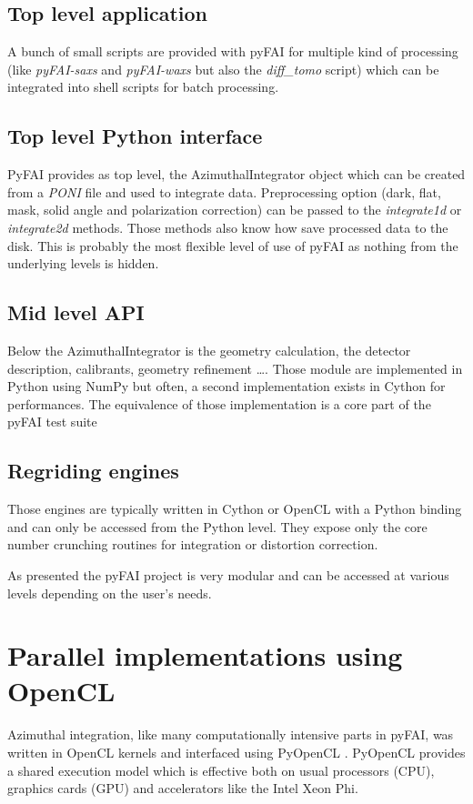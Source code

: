 \documentclass{iucr}
\begin{document}
\subsection{Top level application}
A bunch of small scripts are provided with pyFAI for multiple kind of
processing (like \textit{pyFAI-saxs} and \textit{pyFAI-waxs} but also the
\textit{diff\_tomo} script) which can be integrated into shell scripts for batch
processing.

\subsection{Top level Python interface}
PyFAI provides as top level, the AzimuthalIntegrator object which can be created
from a \textit{PONI} file and used to integrate data. Preprocessing option
(dark, flat, mask, solid angle and polarization correction) can be passed to
the \textit{integrate1d} or \textit{integrate2d} methods.
Those methods also know how save processed data to the disk.
This is probably the most flexible level of use of pyFAI as nothing from the
underlying levels is hidden.

\subsection{Mid level API}
Below the AzimuthalIntegrator is the geometry calculation, the detector
description, calibrants, geometry refinement \ldots. Those module are
implemented in Python using NumPy but often, a second
implementation exists in Cython for performances.
The equivalence of those implementation is a core part of the pyFAI test suite

\subsection{Regriding engines}
Those engines are typically written in Cython or OpenCL with a Python binding
and can only be accessed from the Python level. They expose only the core
number crunching routines for integration or distortion correction.

As presented the pyFAI project is very modular and can be accessed at various
levels depending on the user's needs.

\section{Parallel implementations using OpenCL}
\label{annex_opencl}
Azimuthal integration, like  many computationally intensive parts in pyFAI,
was written in OpenCL kernels and interfaced using PyOpenCL \cite{pyopencl}.
PyOpenCL provides a shared execution model which is effective both on
usual processors (CPU), graphics cards (GPU) and accelerators like the Intel
Xeon Phi.
\end{document}
